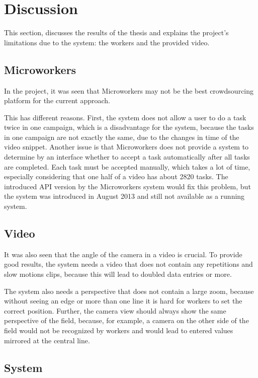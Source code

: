 \chapter{Discussion}

This section, discusses the results of the thesis and explains the project's limitations due to the system: the workers and the provided video.


\section{Microworkers}

In the project, it was seen that Microworkers may not be the best crowdsourcing platform for the current approach.

This has different reasons. First, the system does not allow a user to do a task twice in one campaign, which is a disadvantage for the system, because the tasks in one campaign are not exactly the same, due to the changes in time of the video snippet.
\newline
Another issue is that Microworkers does not provide a system to determine by an interface whether to accept a task automatically after all tasks are completed. Each task must be accepted manually, which takes a lot of time, especially considering that one half of a video has about 2820 tasks.
The introduced API version by the Microworkers system would fix this problem, but the system was introduced in August 2013 and still not available as a running system.

\section{Video}
It was also seen that the angle of the camera in a video is crucial. To provide good results, the system needs a video that does not contain any repetitions and slow motions clips, because this will lead to doubled data entries or more.

The system also needs a perspective that does not contain a large zoom, because without seeing an edge or more than one line it is hard for workers to set the correct position. Further, the camera view should always show the same perspective of the field, because, for example, a camera on the other side of the field would not be recognized by workers and would lead to entered values mirrored at the central line.

\section{System}

